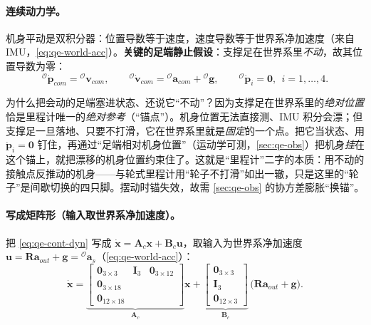 \paragraph{连续动力学。}
机身平动是双积分器：位置导数等于速度，速度导数等于世界系净加速度（来自 IMU，\cref{eq:qe-world-acc}）。\textbf{关键的足端静止假设}：支撑足在世界系里\emph{不动}，故其位置导数为零\cite{yu2021quadruped,unitree2023quadruped}：
\begin{equation}
  {}^{\mathcal{O}}\dot{\boldsymbol p}_{com} = {}^{\mathcal{O}}\boldsymbol v_{com},
  \qquad
  {}^{\mathcal{O}}\dot{\boldsymbol v}_{com} = {}^{\mathcal{O}}\boldsymbol a_{com} + {}^{\mathcal{O}}\boldsymbol g,
  \qquad
  {}^{\mathcal{O}}\dot{\boldsymbol p}_{i} = \boldsymbol 0,\ \ i=1,\dots,4.
  \label{eq:qe-cont-dyn}
\end{equation}

\begin{insight}[足端静止假设是足式里程计的“锚”]\label{ins:qe-foot-anchor}
为什么把会动的足端塞进状态、还说它“不动”？因为支撑足在世界系里的\emph{绝对位置}恰是里程计唯一的\emph{绝对参考}（“锚点”）。机身位置无法直接测、IMU 积分会漂；但支撑足一旦落地、只要不打滑，它在世界系里就是\emph{固定}的一个点。把它当状态、用 $\dot{\boldsymbol p}_i=\boldsymbol 0$ 钉住，再通过“足端相对机身位置”（运动学可测，\cref{sec:qe-obs}）把机身\emph{挂}在这个锚上，就把漂移的机身位置约束住了。这就是“里程计”二字的本质：用不动的接触点反推动的机身——与轮式里程计用“轮子不打滑”如出一辙，只是这里的“轮子”是间歇切换的四只脚。摆动时锚失效，故需 \cref{sec:qe-obs} 的协方差膨胀“换锚”。
\end{insight}

\paragraph{写成矩阵形（输入取世界系净加速度）。}
把 \cref{eq:qe-cont-dyn} 写成 $\dot{\boldsymbol x}=\mathbf{A}_c\boldsymbol x+\mathbf{B}_c\boldsymbol u$，取输入为世界系净加速度 $\boldsymbol u=\mathbf{R}\boldsymbol a_{out}+\boldsymbol g={}^{\mathcal{O}}\boldsymbol a_s$（\cref{eq:qe-world-acc}）\cite{unitree2023quadruped}：
\begin{equation}
  \dot{\boldsymbol x}
  = \underbrace{\begin{bmatrix} \mathbf{0}_{3\times3} & \mathbf{I}_3 & \mathbf{0}_{3\times12}\\ \mathbf{0}_{3\times18} \\ \mathbf{0}_{12\times18} \end{bmatrix}}_{\mathbf{A}_c}\boldsymbol x
  + \underbrace{\begin{bmatrix} \mathbf{0}_{3\times3}\\ \mathbf{I}_3 \\ \mathbf{0}_{12\times3} \end{bmatrix}}_{\mathbf{B}_c}\,\big(\mathbf{R}\boldsymbol a_{out}+\boldsymbol g\big).
  \label{eq:qe-cont-AB}
\end{equation}

